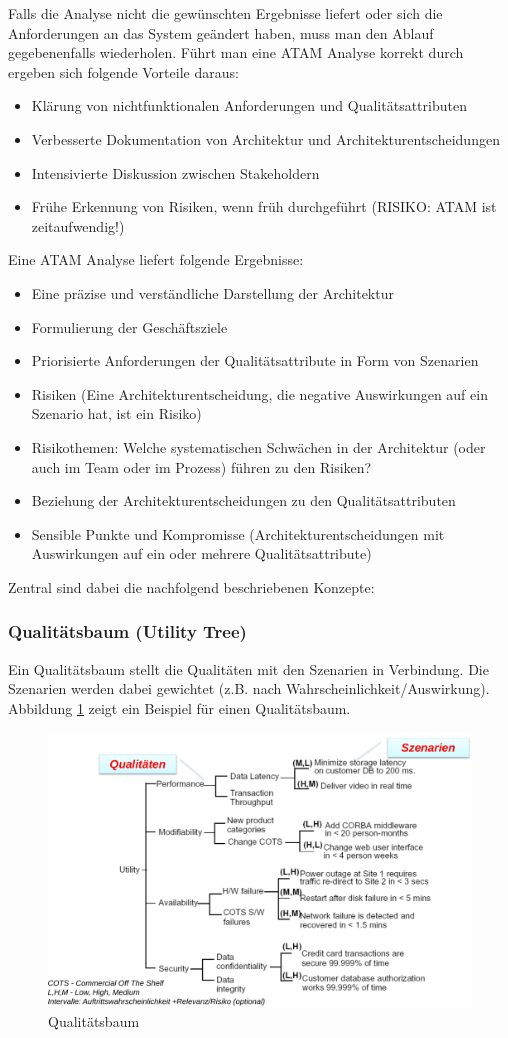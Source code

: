 Falls die Analyse nicht die gewünschten Ergebnisse liefert oder sich die Anforderungen an das System geändert haben, muss man den Ablauf gegebenenfalls wiederholen. Führt man eine ATAM Analyse korrekt durch ergeben sich folgende Vorteile daraus:
\begin{itemize}
	\item Klärung von nichtfunktionalen Anforderungen und Qualitätsattributen
	\item Verbesserte Dokumentation von Architektur und Architekturentscheidungen
	\item Intensivierte Diskussion zwischen Stakeholdern
	\item Frühe Erkennung von Risiken, wenn früh durchgeführt (RISIKO: ATAM ist zeitaufwendig!)
\end{itemize}
Eine ATAM Analyse liefert folgende Ergebnisse:
\begin{itemize}
	\item Eine präzise und verständliche Darstellung der Architektur
	\item Formulierung der Geschäftsziele
	\item Priorisierte Anforderungen der Qualitätsattribute in Form von Szenarien
	\item Risiken (Eine Architekturentscheidung, die negative Auswirkungen auf ein Szenario hat, ist ein Risiko)
	\item Risikothemen: Welche systematischen Schwächen in der Architektur (oder auch im Team oder im Prozess) führen zu den Risiken?
	\item Beziehung der Architekturentscheidungen zu den Qualitätsattributen
	\item Sensible Punkte und Kompromisse (Architekturentscheidungen mit Auswirkungen auf ein oder mehrere Qualitätsattribute)
\end{itemize}
Zentral sind dabei die nachfolgend beschriebenen Konzepte:

\subsubsection{Qualitätsbaum (Utility Tree)}

Ein Qualitätsbaum stellt die Qualitäten mit den Szenarien in Verbindung. Die Szenarien werden dabei gewichtet (z.B. nach Wahrscheinlichkeit/Auswirkung). Abbildung \ref{fig:utility-tree} zeigt ein Beispiel für einen Qualitätsbaum.

\begin{figure}
\centering
\includegraphics[width=0.7\linewidth]{fig/utility-tree}
\caption{Qualitätsbaum}
\label{fig:utility-tree}
\end{figure}

